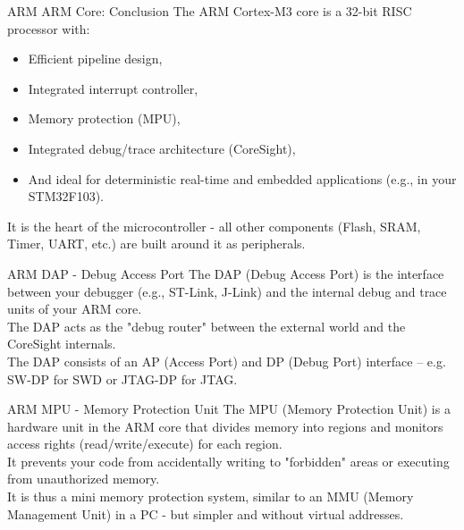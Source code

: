 \documentclass{beamer}
\begin{document}
\begin{frame}{ARM}
	{ARM Core: Conclusion}
	The ARM Cortex-M3 core is a 32-bit RISC processor with:
	\begin{itemize}
		\item Efficient pipeline design,
		\item Integrated interrupt controller,
		\item Memory protection (MPU),
		\item Integrated debug/trace architecture (CoreSight),
		\item And ideal for deterministic real-time and embedded applications (e.g., in your STM32F103).
	\end{itemize}
	It is the heart of the microcontroller - all other components (Flash, SRAM, Timer, UART, etc.) are built around it as peripherals.
\end{frame}
\begin{frame}{ARM}
	{DAP - Debug Access Port}
	The DAP (Debug Access Port) is the interface between your debugger (e.g., ST-Link, J-Link) and the internal debug and trace units of your ARM core.\\
	\vspace{0.2cm}
	The DAP acts as the "debug router" between the external world and the CoreSight internals.\\
	\vspace{0.2cm}
	The DAP consists of an AP (Access Port) and DP (Debug Port) interface – e.g. SW-DP for SWD or JTAG-DP for JTAG.
\end{frame}
\begin{frame}{ARM}
	{MPU - Memory Protection Unit}
	The MPU (Memory Protection Unit) is a hardware unit in the ARM core that divides memory into regions and monitors access rights (read/write/execute) for each region.\\
	\vspace{0.2cm}
	It prevents your code from accidentally writing to "forbidden" areas or executing from unauthorized memory.\\
	\vspace{0.2cm}
	It is thus a mini memory protection system, similar to an MMU (Memory Management Unit) in a PC - but simpler and without virtual addresses.
\end{frame}
\end{document}
